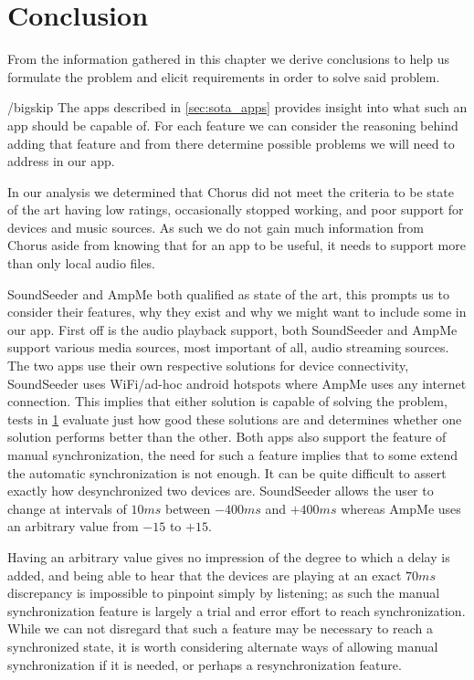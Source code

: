 \section{Conclusion}
From the information gathered in this chapter we derive conclusions to help us formulate the problem and elicit requirements in order to solve said problem.

/bigskip
The apps described in \cref{sec:sota_apps} provides insight into what such an app should be capable of.
For each feature we can consider the reasoning behind adding that feature and from there determine possible problems we will need to address in our app.

In our analysis we determined that Chorus did not meet the criteria to be state of the art having low ratings, occasionally stopped working, and poor support for devices and music sources.
As such we do not gain much information from Chorus aside from knowing that for an app to be useful, it needs to support more than only local audio files.

SoundSeeder and AmpMe both qualified as state of the art, this prompts us to consider their features, why they exist and why we might want to include some in our app.
First off is the audio playback support, both SoundSeeder and AmpMe support various media sources, most important of all, audio streaming sources.
The two apps use their own respective solutions for device connectivity, SoundSeeder uses WiFi/ad-hoc android hotspots where AmpMe uses any internet connection.
This implies that either solution is capable of solving the problem, tests in \cref{} evaluate just how good these solutions are and determines whether one solution performs better than the other.
Both apps also support the feature of manual synchronization, the need for such a feature implies that to some extend the automatic synchronization is not enough.
It can be quite difficult to assert exactly how desynchronized two devices are.
SoundSeeder allows the user to change at intervals of $10 ms$ between $-400 ms$ and $+400 ms$ whereas AmpMe uses an arbitrary value from $-15$ to $+15$.

Having an arbitrary value gives no impression of the degree to which a delay is added, and being able to hear that the devices are playing at an exact $70ms$ discrepancy is impossible to pinpoint simply by listening; as such the manual synchronization feature is largely a trial and error effort to reach synchronization.
While we can not disregard that such a feature may be necessary to reach a synchronized state, it is worth considering alternate ways of allowing manual synchronization if it is needed, or perhaps a resynchronization feature.

